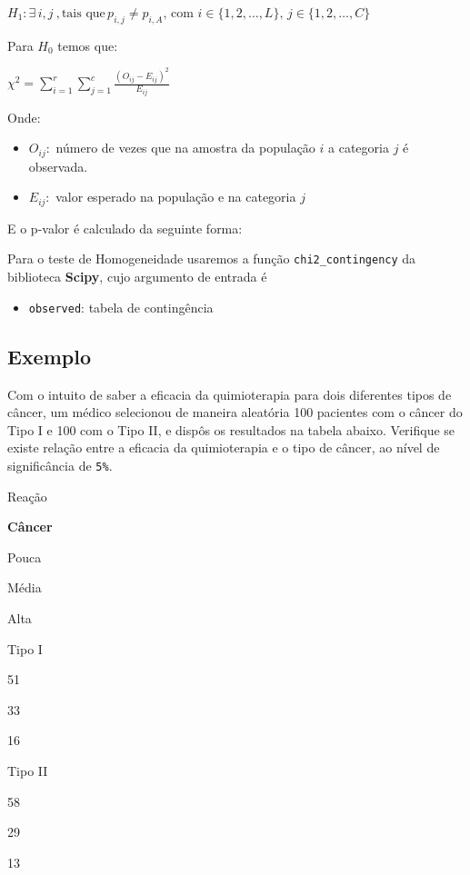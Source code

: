 \documentclass[
  letterpaper,
  DIV=11,
  numbers=noendperiod]{scrreprt}
\providecommand{\tightlist}{%
  \setlength{\itemsep}{0pt}\setlength{\parskip}{0pt}}\usepackage{longtable,booktabs,array}
\begin{document}
\(H_1: \exists \, i, j \ , \text{tais que} \, p_{i,j} \neq p_{i,A}, \, \text{com } i \in \{1, 2, \dots, L\}, \, j \in \{1, 2, \dots, C\}\)

Para \(H_0\) temos que:

\(\chi^2 = \displaystyle\sum_{i=1}^r \displaystyle\sum_{j=1}^c \frac{(O_{ij} - E_{ij})^2}{E_{ij}}\)

Onde:

\begin{itemize}
\tightlist
\item
  \(O_{ij} :\) número de vezes que na amostra da população \(i\) a
  categoria \(j\) é observada.
\item
  \(E_{ij} :\) valor esperado na população e na categoria \(j\)
\end{itemize}

E o p-valor é calculado da seguinte forma:

Para o teste de Homogeneidade usaremos a função
\texttt{chi2\_contingency} da biblioteca \textbf{Scipy}, cujo argumento
de entrada é

\begin{itemize}
\tightlist
\item
  \texttt{observed}: tabela de contingência
\end{itemize}

\hypertarget{exemplo-8}{%
\subsection{Exemplo}\label{exemplo-8}}

Com o intuito de saber a eficacia da quimioterapia para dois diferentes
tipos de câncer, um médico selecionou de maneira aleatória 100 pacientes
com o câncer do Tipo I e 100 com o Tipo II, e dispôs os resultados na
tabela abaixo. Verifique se existe relação entre a eficacia da
quimioterapia e o tipo de câncer, ao nível de significância de
\texttt{5\%}.

Reação

\textbf{Câncer}

Pouca

Média

Alta

Tipo I

51

33

16

Tipo II

58

29

13
\end{document}
